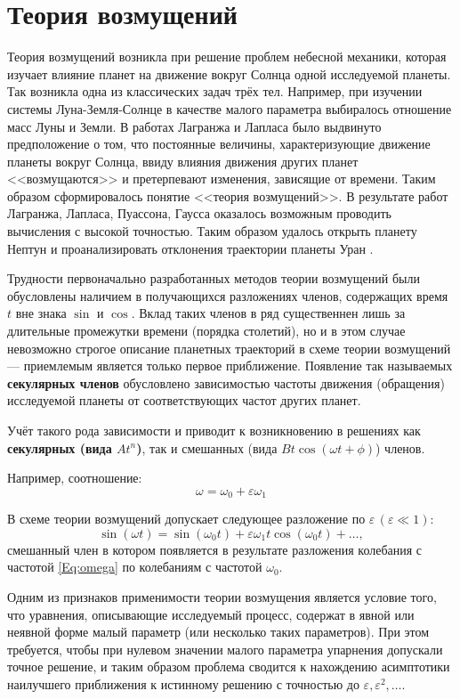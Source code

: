 \chapter*{Теория возмущений}

Теория возмущений возникла при решение
проблем небесной механики,
которая изучает влияние планет
на движение вокруг Солнца одной исследуемой планеты.
Так возникла одна из классических задач трёх тел.
Например, при изучении системы Луна-Земля-Солнце
в качестве малого параметра выбиралось
отношение масс Луны и Земли.
В работах Лагранжа и Лапласа было
выдвинуто предположение о том,
что постоянные величины,
характеризующие движение планеты вокруг Солнца,
ввиду влияния движения других планет <<возмущаются>>
и претерпевают изменения, зависящие от времени.
Таким образом сформировалось понятие <<теория возмущений>>.
В результате работ Лагранжа, Лапласа, Пуассона, Гаусса
оказалось возможным проводить вычисления с высокой точностью.
Таким образом удалось открыть планету Нептун
и проанализировать отклонения траектории планеты Уран \cite{vinogradov1977}.

Трудности первоначально разработанных методов теории возмущений
были обусловлены наличием в получающихся разложениях членов,
содержащих время $t$ вне знака $\sin$ и $\cos$.
Вклад таких членов в ряд существеннен лишь
за длительные промежутки времени (порядка столетий),
но и в этом случае невозможно строгое описание планетных
траекторий в схеме теории возмущений ---
приемлемым является только первое приближение.
Появление так называемых \textbf{секулярных членов}
обусловлено зависимостью частоты движения (обращения)
исследуемой планеты от соответствующих частот других планет.

Учёт такого рода зависимости и
приводит к возникновению в решениях
как \textbf{секулярных (вида $A t^n$)},
так и смешанных (вида $B t \cos(\omega t + \phi)$) членов.

Например, соотношение:
\begin{equation} \label{Eq:omega}
    \omega = \omega_0 + \varepsilon \omega_1 
\end{equation}

В схеме теории возмущений допускает
следующее разложение по $\varepsilon \, (\varepsilon \ll 1)$:
\begin{equation*}
    \sin(\omega t) = \sin(\omega_0 t) +
    \varepsilon \omega_1 t \cos(\omega_0 t) + \dots,
\end{equation*}
смешанный член в котором появляется в результате разложения
колебания с частотой \eqref{Eq:omega}
по колебаниям с частотой $\omega_0$.

Одним из признаков применимости теории возмущения
является условие того, что уравнения,
описывающие исследуемый процесс,
содержат в явной или неявной форме малый параметр
(или несколько таких параметров).
При этом требуется, чтобы при нулевом значении
малого параметра упарнения допускали точное решение,
и таким образом проблема сводится к нахождению
асимптотики наилучшего приближения к истинному решению
с точностью до $\varepsilon, \varepsilon^2, \dots$.
